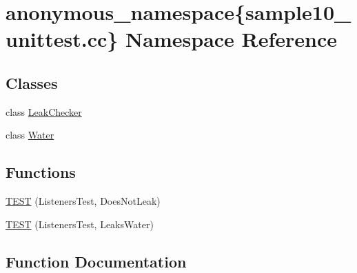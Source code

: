 \hypertarget{namespaceanonymous__namespace_02sample10__unittest_8cc_03}{}\section{anonymous\+\_\+namespace\{sample10\+\_\+unittest.\+cc\} Namespace Reference}
\label{namespaceanonymous__namespace_02sample10__unittest_8cc_03}
\subsection*{Classes}
\begin{DoxyCompactItemize}
\item 
class \hyperlink{classanonymous__namespace_02sample10__unittest_8cc_03_1_1LeakChecker}{Leak\+Checker}
\item 
class \hyperlink{classanonymous__namespace_02sample10__unittest_8cc_03_1_1Water}{Water}
\end{DoxyCompactItemize}
\subsection*{Functions}
\begin{DoxyCompactItemize}
\item 
\hyperlink{namespaceanonymous__namespace_02sample10__unittest_8cc_03_a56a1085b1272d8429d1b728746d7c935}{T\+E\+ST} (Listeners\+Test, Does\+Not\+Leak)
\item 
\hyperlink{namespaceanonymous__namespace_02sample10__unittest_8cc_03_ace894bb8dc5a7491b185e75cf4989800}{T\+E\+ST} (Listeners\+Test, Leaks\+Water)
\end{DoxyCompactItemize}


\subsection{Function Documentation}
\mbox{\label{namespaceanonymous__namespace_02sample10__unittest_8cc_03_a56a1085b1272d8429d1b728746d7c935}} 
